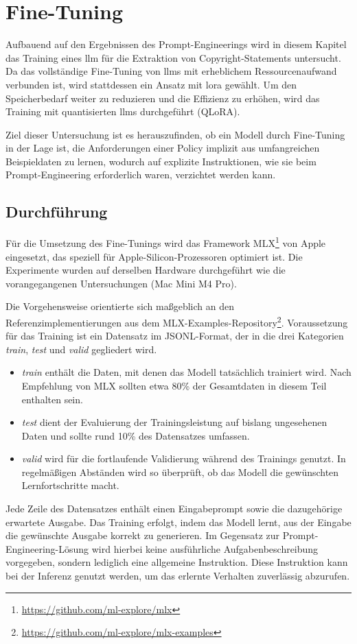\chapter{Fine-Tuning}\label{ch:fine-tuning}

Aufbauend auf den Ergebnissen des Prompt-Engineerings wird in diesem Kapitel das Training eines \gls{llm} für die Extraktion von Copyright-Statements untersucht.
Da das vollständige Fine-Tuning von \glspl{llm} mit erheblichem Ressourcenaufwand verbunden ist, wird stattdessen ein Ansatz mit \gls{lora} gewählt.
Um den Speicherbedarf weiter zu reduzieren und die Effizienz zu erhöhen, wird das Training mit quantisierten \glspl{llm} durchgeführt (QLoRA).

Ziel dieser Untersuchung ist es herauszufinden, ob ein Modell durch Fine-Tuning in der Lage ist, die Anforderungen einer Policy implizit aus umfangreichen Beispieldaten zu lernen, wodurch auf explizite Instruktionen, wie sie beim Prompt-Engineering erforderlich waren, verzichtet werden kann.

\section{Durchführung}

Für die Umsetzung des Fine-Tunings wird das Framework MLX\footnote{\url{https://github.com/ml-explore/mlx}} von Apple eingesetzt, das speziell für Apple-Silicon-Prozessoren optimiert ist.
Die Experimente wurden auf derselben Hardware durchgeführt wie die vorangegangenen Untersuchungen (Mac Mini M4 Pro).

Die Vorgehensweise orientierte sich maßgeblich an den Referenzimplementierungen aus dem MLX-Examples-Repository\footnote{\url{https://github.com/ml-explore/mlx-examples}}.
Voraussetzung für das Training ist ein Datensatz im JSONL-Format, der in die drei Kategorien \textit{train}, \textit{test} und \textit{valid} gegliedert wird.

\begin{itemize}
    \item \textit{train} enthält die Daten, mit denen das Modell tatsächlich trainiert wird. Nach Empfehlung von MLX sollten etwa \num{80}\% der Gesamtdaten in diesem Teil enthalten sein.
    \item \textit{test} dient der Evaluierung der Trainingsleistung auf bislang ungesehenen Daten und sollte rund \num{10}\% des Datensatzes umfassen.
    \item \textit{valid} wird für die fortlaufende Validierung während des Trainings genutzt. In regelmäßigen Abständen wird so überprüft, ob das Modell die gewünschten Lernfortschritte macht.
\end{itemize}
Jede Zeile des Datensatzes enthält einen Eingabeprompt sowie die dazugehörige erwartete Ausgabe.
Das Training erfolgt, indem das Modell lernt, aus der Eingabe die gewünschte Ausgabe korrekt zu generieren.
Im Gegensatz zur Prompt-Engineering-Lösung wird hierbei keine ausführliche Aufgabenbeschreibung vorgegeben, sondern lediglich eine allgemeine Instruktion.
Diese Instruktion kann bei der Inferenz genutzt werden, um das erlernte Verhalten zuverlässig abzurufen.

